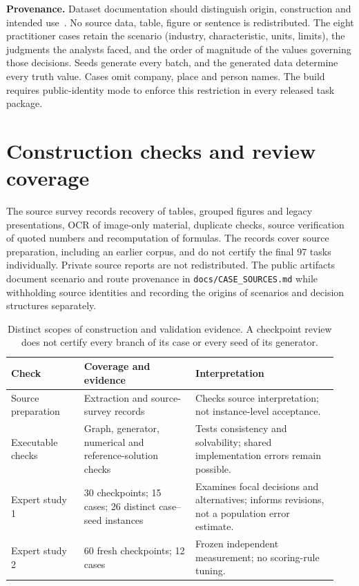 \documentclass{article}
\begin{document}
\textbf{Provenance.} Dataset documentation should distinguish origin, construction and
intended use~\citep{gebru2021datasheets}. No source data, table, figure or sentence is redistributed. The eight practitioner cases retain the scenario (industry, characteristic, units, limits), the judgments the analysts faced, and the order of magnitude of the values governing those decisions. Seeds generate every batch, and the generated data determine every truth value. Cases omit company, place and person names. The build requires public-identity mode to enforce this restriction in every released task package.

\section{Construction checks and review coverage}
\label{app:construction-qc}

The source survey records recovery of tables, grouped figures and legacy presentations,
OCR of image-only material, duplicate checks, source verification of quoted numbers and
recomputation of formulas. The records cover source preparation, including an earlier corpus, and do not certify the final 97 tasks individually. Private source
reports are not redistributed. The public artifacts document scenario and route provenance in \nolinkurl{docs/CASE_SOURCES.md} while withholding source identities and recording the origins of scenarios and decision structures separately.

\begin{table}[!htbp]
\caption{Distinct scopes of construction and validation evidence. A checkpoint review does not certify every branch of its case or every seed of its generator.}
\label{tab:construction-qc}
\centering\small
\begin{tabular}{@{}P{0.21\linewidth}P{0.32\linewidth}P{0.41\linewidth}@{}}
\toprule
Check & Coverage and evidence & Interpretation \\
\midrule
Source preparation & Extraction and source-survey records & Checks source interpretation; not instance-level acceptance. \\
Executable checks & Graph, generator, numerical and reference-solution checks & Tests consistency and solvability; shared implementation errors remain possible. \\
Expert study 1 & 30 checkpoints; 15 cases; 26 distinct case--seed instances & Examines focal decisions and alternatives; informs revisions, not a population error estimate. \\
Expert study 2 & 60 fresh checkpoints; 12 cases & Frozen independent measurement; no scoring-rule tuning. \\
\bottomrule
\end{tabular}

\end{table}
\end{document}
